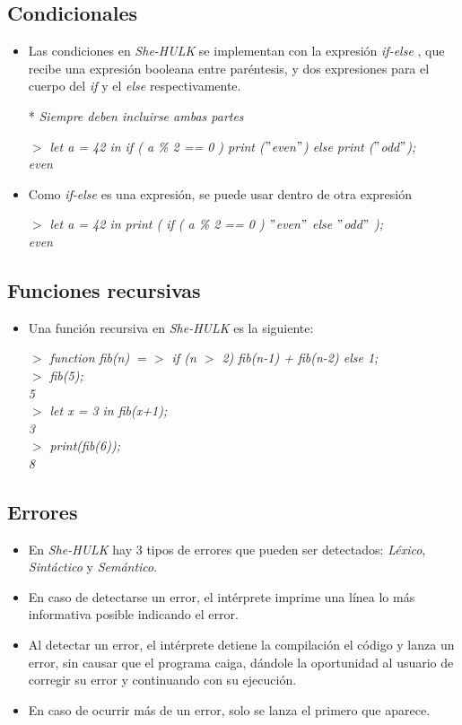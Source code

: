 \documentclass[12pt]{article}
\newcommand{\shehulk}{\emph{She-HULK} }
\newcommand{\ini}{$>$ }
\newcommand{\ifelse}{\textit{if-else} }
\begin{document}
\subsection*{Condicionales}
\begin{itemize}
	\item Las condiciones en \shehulk se implementan con la expresión \ifelse , que recibe una expresión booleana entre paréntesis, y dos expresiones para el cuerpo del \textit{if} y el \textit{else} respectivamente.
	
	* \emph{Siempre deben incluirse ambas partes}
	
	\emph{
	\ini let a = 42 in if ( a \% 2 == 0 ) print ($"$even$"$) else print ($"$odd$"$); \\
	even
	}
	
	\item Como \ifelse es una expresión, se puede usar dentro de otra expresión
	
	\emph{
	\ini let a = 42 in print ( if ( a \% 2 == 0 ) $"$even$"$ else $"$odd$"$ ); \\
	even
	}
\end{itemize}

\subsection*{Funciones recursivas}
\begin{itemize}
	\item Una función recursiva en \shehulk es la siguiente:
	
	\emph{
	\ini function fib(n) $=>$ if (n $>$ 2) fib(n-1) + fib(n-2) else 1;	\\
	\ini fib(5); \\
	5 \\
	\ini let x = 3 in fib(x+1); \\
	3 \\
	\ini print(fib(6)); \\
	8
	}
\end{itemize}

\subsection*{Errores}
\begin{itemize}
	\item En \shehulk hay 3 tipos de errores que pueden ser detectados: \emph{Léxico}, \emph{Sintáctico} y \emph{Semántico}.
	\item En caso de detectarse un error, el intérprete imprime una línea lo más informativa posible indicando el error.
	\item Al detectar un error, el intérprete detiene la compilación el código y lanza un error, sin causar que el programa caiga, dándole la oportunidad al usuario de corregir su error y continuando con su ejecución.
	\item En caso de ocurrir más de un error, solo se lanza el primero que aparece.
\end{itemize}
\end{document}
